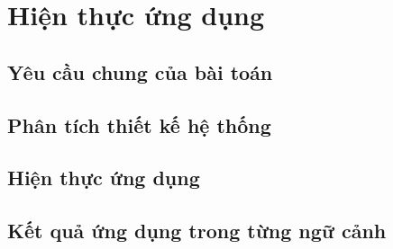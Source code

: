 \section{Hiện thực ứng dụng}
\label{results}

\subsection{Yêu cầu chung của bài toán}

\subsection{Phân tích thiết kế hệ thống}

\subsection{Hiện thực ứng dụng}

\subsection{Kết quả ứng dụng trong từng ngữ cảnh}